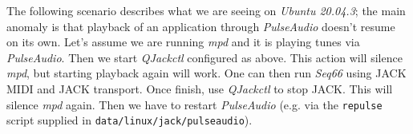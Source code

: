    The following scenario describes what we are seeing on
   \textsl{Ubuntu 20.04.3}; the main anomaly is that playback of
   an application through \textsl{PulseAudio} doesn't resume on its own.
   Let's assume we are running \textsl{mpd} and it is playing tunes via
   \textsl{PulseAudio}.
   Then we start \textsl{QJackctl} configured as above.
   This action will silence \textsl{mpd}, but starting playback again will
   work.
   One can then run \textsl{Seq66} using JACK MIDI and JACK transport.
   Once finish, use \textsl{QJackctl} to stop JACK.
   This will silence \textsl{mpd} again.
   Then we have to restart \textsl{PulseAudio} (e.g. via the
   \texttt{repulse} script supplied in \texttt{data/linux/jack/pulseaudio}).

